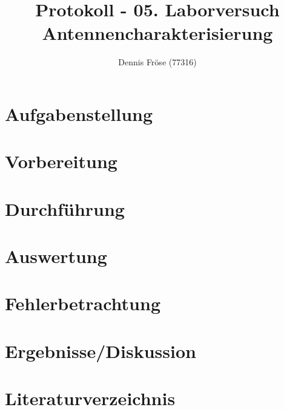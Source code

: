 \documentclass[12pt,parskip=full]{scrartcl}
\title{Protokoll - 05. Laborversuch Antennencharakterisierung}
\author{%
Dennis Fröse (77316)%
}
\begin{document}
	
\section*{Aufgabenstellung}

\section*{Vorbereitung}

\section*{Durchführung}

\section*{Auswertung}

\section*{Fehlerbetrachtung} %

\section*{Ergebnisse/Diskussion} %

\section*{Literaturverzeichnis}
\printbibliography[heading=none]
\end{document}
